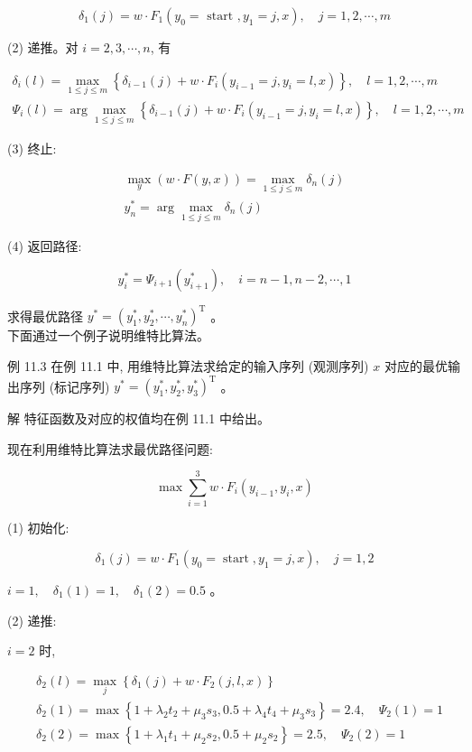 \documentclass[10pt]{article}
\begin{document}
\begin{CJK*}{UTF8}{bsmi}
$$
\delta_{1}(j)=w \cdot F_{1}\left(y_{0}=\text { start }, y_{1}=j, x\right), \quad j=1,2, \cdots, m
$$

(2) 递推。对 $i=2,3, \cdots, n$, 有

$$
\begin{gathered}
\delta_{i}(l)=\max _{1 \leqslant j \leqslant m}\left\{\delta_{i-1}(j)+w \cdot F_{i}\left(y_{i-1}=j, y_{i}=l, x\right)\right\}, \quad l=1,2, \cdots, m \\
\Psi_{i}(l)=\arg \max _{1 \leqslant j \leqslant m}\left\{\delta_{i-1}(j)+w \cdot F_{i}\left(y_{i-1}=j, y_{i}=l, x\right)\right\}, \quad l=1,2, \cdots, m
\end{gathered}
$$

(3) 终止:

$$
\begin{gathered}
\max _{y}(w \cdot F(y, x))=\max _{1 \leqslant j \leqslant m} \delta_{n}(j) \\
y_{n}^{*}=\arg \max _{1 \leqslant j \leqslant m} \delta_{n}(j)
\end{gathered}
$$

(4) 返回路径:

$$
y_{i}^{*}=\Psi_{i+1}\left(y_{i+1}^{*}\right), \quad i=n-1, n-2, \cdots, 1
$$

求得最优路径 $y^{*}=\left(y_{1}^{*}, y_{2}^{*}, \cdots, y_{n}^{*}\right)^{\mathrm{T}}$ 。\\
下面通过一个例子说明维特比算法。

例 11.3 在例 11.1 中, 用维特比算法求给定的输入序列 (观测序列) $x$ 对应的最优输出序列 (标记序列) $y^{*}=\left(y_{1}^{*}, y_{2}^{*}, y_{3}^{*}\right)^{\mathrm{T}}$ 。

解 特征函数及对应的权值均在例 11.1 中给出。

现在利用维特比算法求最优路径问题:

$$
\max \sum_{i=1}^{3} w \cdot F_{i}\left(y_{i-1}, y_{i}, x\right)
$$

(1) 初始化:

$$
\delta_{1}(j)=w \cdot F_{1}\left(y_{0}=\operatorname{start}, y_{1}=j, x\right), \quad j=1,2
$$

$i=1, \quad \delta_{1}(1)=1, \quad \delta_{1}(2)=0.5$ 。

(2) 递推:

$i=2$ 时,

$$
\begin{aligned}
& \delta_{2}(l)=\max _{j}\left\{\delta_{1}(j)+w \cdot F_{2}(j, l, x)\right\} \\
& \delta_{2}(1)=\max \left\{1+\lambda_{2} t_{2}+\mu_{3} s_{3}, 0.5+\lambda_{4} t_{4}+\mu_{3} s_{3}\right\}=2.4, \quad \Psi_{2}(1)=1 \\
& \delta_{2}(2)=\max \left\{1+\lambda_{1} t_{1}+\mu_{2} s_{2}, 0.5+\mu_{2} s_{2}\right\}=2.5, \quad \Psi_{2}(2)=1
\end{aligned}
$$


\end{CJK*}
\end{document}
